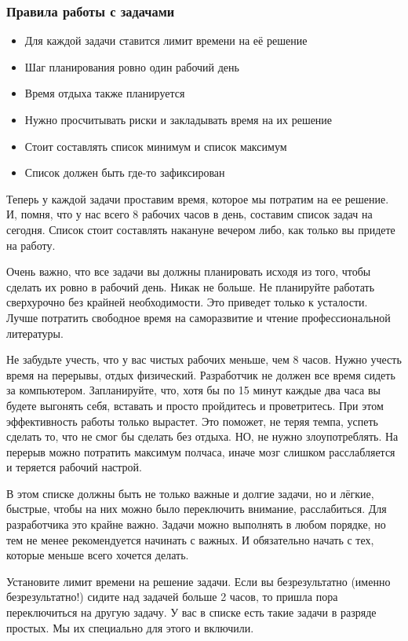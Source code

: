 \documentclass{../industrial-development}
\begin{document}
\begin{frame} \frametitle{Правила работы с задачами}
  \begin{itemize}
  \item Для каждой задачи ставится лимит времени на её решение
  \item Шаг планирования ровно один рабочий день
  \item Время отдыха также планируется
  \item Нужно просчитывать риски и закладывать время на их решение
  \item Стоит составлять список минимум и список максимум
  \item Список должен быть где-то зафиксирован
  \end{itemize}
\end{frame}

\lecturenotes

Теперь у каждой задачи проставим время, которое мы потратим на ее решение. И, помня, что у нас всего 8 рабочих часов в день, составим список задач на сегодня. Список стоит составлять накануне вечером либо, как только вы придете на работу.

Очень важно, что все задачи вы должны планировать исходя из того, чтобы сделать их ровно в рабочий день. Никак не больше. Не планируйте работать сверхурочно без крайней необходимости. Это приведет только к усталости. Лучше потратить свободное время на саморазвитие и чтение профессиональной литературы.

Не забудьте учесть, что у вас чистых рабочих меньше, чем 8 часов. Нужно учесть время на перерывы, отдых физический. Разработчик не должен все время сидеть за компьютером. Запланируйте, что, хотя бы по 15 минут каждые два часа вы будете выгонять себя, вставать и просто пройдитесь и проветритесь. При этом эффективность работы только вырастет. Это поможет, не теряя темпа, успеть сделать то, что не смог бы сделать без отдыха.
НО, не нужно злоупотреблять. На перерыв можно потратить максимум полчаса, иначе мозг слишком расслабляется и теряется рабочий настрой.

В этом списке должны быть не только важные и долгие задачи, но и лёгкие, быстрые, чтобы на них можно было переключить внимание, расслабиться. Для разработчика это крайне важно. Задачи можно выполнять в любом порядке, но тем не менее рекомендуется начинать с важных. И обязательно начать с тех, которые меньше всего хочется делать.

Установите лимит времени на решение задачи. Если вы безрезультатно (именно безрезультатно!) сидите над задачей больше 2 часов, то пришла пора переключиться на другую задачу. У вас в списке есть такие задачи в разряде простых. Мы их специально для этого и включили.
\end{document}
